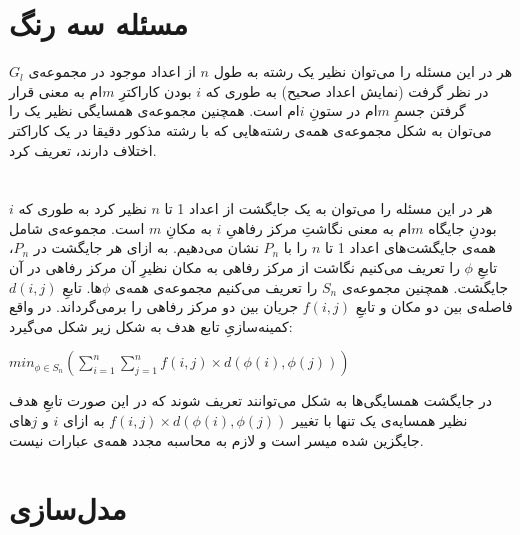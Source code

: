 \documentclass{article}
\begin{document}
\subsection{}
\subsection{}
\subsection{}



\section{مسئله سه رنگ}
هر  در این مسئله را می‌توان نظیر یک رشته به طول $n$ از اعداد موجود در مجموعه‌ی $G_{l}$ در نظر گرفت (نمایش اعداد صحیح) به طوری که $i$ بودن کاراکترِ $m$ام به معنی قرار گرفتن جسمِ $m$ام در ستونِ $i$ام است. همچنین مجموعه‌ی همسایگی نظیر یک  را می‌توان به شکل مجموعه‌ی همه‌ی رشته‌هایی که با رشته مذکور دقیقا در یک کاراکتر اختلاف دارند، تعریف کرد.



\section{}
هر  در این مسئله را می‌توان به یک جایگشت از اعداد 1 تا $n$ نظیر کرد به طوری که $i$ بودنِ جایگاه $m$ام به معنی نگاشتِ مرکز رفاهیِ $i$ به مکانِ $m$ است. مجموعه‌ی شامل همه‌ی جایگشت‌های اعداد 1 تا $n$ را با $P_{n}$ نشان می‌دهیم.
به ازای هر جایگشت در $P_{n}$، تابعِ $\phi$ را تعریف می‌کنیم نگاشت از مرکز رفاهی به مکان نظیرِ آن مرکز رفاهی در آن جایگشت. همچنین مجموعه‌ی 
$
S_{n}
$
را تعریف می‌کنیم مجموعه‌ی همه‌ی $\phi$ها. 
 تابعِ 
$
d(i, j)
$
فاصله‌ی بین دو مکان و تابعِ 
$
f(i, j)
$
جریان بین دو مرکز رفاهی را برمی‌گرداند. در واقع کمینه‌سازیِ تابع هدف به شکل زیر شکل می‌گیرد:
\begin{latin}
$
min_{\phi \in S_{n}}(\sum_{i=1}^{n}\sum_{j=1}^{n} f(i, j)\times d(\phi(i), \phi(j)))
$
\end{latin}
در جایگشت همسایگی‌ها به شکل  می‌توانند تعریف شوند که در این صورت تابعِ هدف نظیر همسایه‌ی یک  تنها با تغییر
$f(i, j)\times d(\phi(i), \phi(j))$
به ازای $i$ و $j$های جایگزین شده میسر است و لازم به محاسبه مجدد همه‌ی عبارات نیست.


\section{مدل‌سازی}
\end{document}
